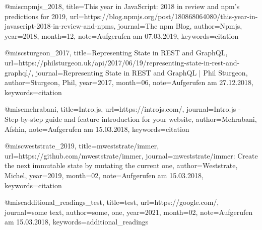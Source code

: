 @misc{npmjs_2018, title={This year in JavaScript: 2018 in review and npm's predictions for 2019}, url={https://blog.npmjs.org/post/180868064080/this-year-in-javascript-2018-in-review-and-npms}, journal={The npm Blog}, author={Npmjs}, year={2018}, month={12}, note={Aufgerufen am 07.03.2019}, keywords={citation}}

@misc{sturgeon_2017, title={Representing State in REST and GraphQL}, url={https://philsturgeon.uk/api/2017/06/19/representing-state-in-rest-and-graphql/}, journal={Representing State in REST and GraphQL | Phil Sturgeon}, author={Sturgeon, Phil}, year={2017}, month={06}, note={Aufgerufen am 27.12.2018}, keywords={citation}}

@misc{mehrabani, title={Intro.js}, url={https://introjs.com/}, journal={Intro.js - Step-by-step guide and feature introduction for your website}, author={Mehrabani, Afshin}, note={Aufgerufen am 15.03.2018}, keywords={citation}}

@misc{weststrate_2019, title={mweststrate/immer}, url={https://github.com/mweststrate/immer}, journal={mweststrate/immer: Create the next immutable state by mutating the current one}, author={Weststrate, Michel}, year={2019}, month={02}, note={Aufgerufen am 15.03.2018}, keywords={citation}}

@misc{additional_readings_test, title={test}, url={https://google.com/}, journal={some text}, author={some, one}, year={2021}, month={02}, note={Aufgerufen am 15.03.2018}, keywords={additional_readings}}
